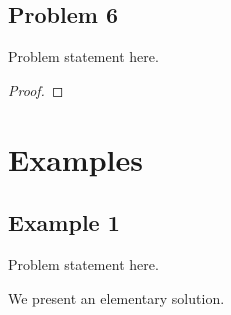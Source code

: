 \documentclass[11pt]{scrartcl}
\begin{document}
 \subsection{Problem 6}

\begin{tcolorbox}[purplebox,title={Problem statement}]
Problem statement here.
\end{tcolorbox}

\begin{claim*}
\end{claim*}


\begin{proof}
\end{proof}

\begin{remark*}
\end{remark*}

\pagebreak








 \section{Examples}

 
\subsection{Example 1}

\begin{tcolorbox}[purplebox,title={Problem statement}]
Problem statement here.
\end{tcolorbox}

We present an elementary solution.
\end{document}
